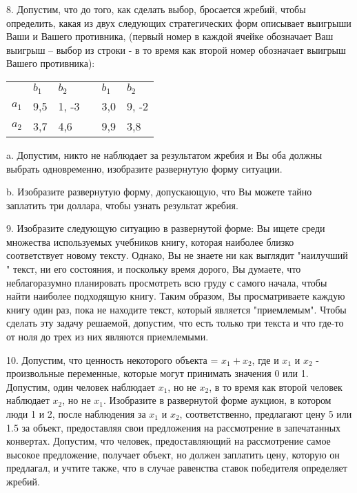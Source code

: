 \documentclass[a4paper,12pt]{article}
\begin{document}
8. Допустим, что до того, как сделать выбор,
бросается жребий, чтобы определить, какая из двух
следующих стратегических форм описывает выигрыши
Ваши и Вашего противника, (первый номер в каждой
ячейке обозначает Ваш выигрыш -- выбор из строки -
в то время как второй номер обозначает выигрыш
Вашего противника):

\bigskip \begin{tabular}{llllll}
& $b_{1}$ & $b_{2}$ &  & $b_{1}$ & $b_{2}$ \\
\cline{2-3}\cline{5-6} $a_{1}$ &
\multicolumn{1}{|l}{9,5} & \multicolumn{1}{|l}{1,
-3} & \multicolumn{1}{|l}{} &
\multicolumn{1}{|l}{3,0} & \multicolumn{1}{|l|}{9,
-2 } \\ \cline{2-3}\cline{5-6} $a_{2}$ &
\multicolumn{1}{|l}{3,7} & \multicolumn{1}{|l}{4,6}
& \multicolumn{1}{|l}{} & \multicolumn{1}{|l}{9,9}
& \multicolumn{1}{|l|}{3,8}
\\ \cline{2-3}\cline{5-6}
\end{tabular}

a. Допустим, никто не наблюдает за результатом
жребия и Вы оба должны выбрать одновременно,
изобразите развернутую форму ситуации.

b. Изобразите развернутую форму, допускающую, что
Вы можете тайно заплатить три доллара, чтобы узнать
результат жребия.

9. Изобразите следующую ситуацию в развернутой
форме: Вы ищете среди множества используемых
учебников книгу, которая наиболее близко
соответствует новому тексту. Однако, Вы не знаете
ни как выглядит "наилучший " текст, ни его
состояния, и поскольку время дорого, Вы думаете,
что неблагоразумно планировать просмотреть всю
груду с самого начала, чтобы найти наиболее
подходящую книгу. Таким образом, Вы просматриваете
каждую книгу один раз, пока не находите текст,
который является "приемлемым". Чтобы сделать эту
задачу решаемой, допустим, что есть только три
текста и что где-то от ноля до трех из них являются
приемлемыми.

10. Допустим, что ценность некоторого объекта =
$x_{1}+x_{2}$, где и $x_{1}$ и $x_{2}$ -
произвольные переменные, которые могут принимать
значения 0 или 1. Допустим, один человек наблюдает
$x_{1}$, но не $x_{2}$, в то время как второй
человек наблюдает $x_{2}$, но не $x_{1}$.
Изобразите в развернутой форме аукцион, в котором
люди 1 и 2, после наблюдения за $x_{1}$ и $x_{2}$,
соответственно, предлагают цену 5 или 1.5 за
объект, предоставляя свои предложения на
рассмотрение в запечатанных конвертах. Допустим,
что человек, предоставляющий на рассмотрение самое
высокое предложение, получает объект, но должен
заплатить цену, которую он предлагал, и учтите
также, что в случае равенства ставок победителя
определяет жребий.
\end{document}
